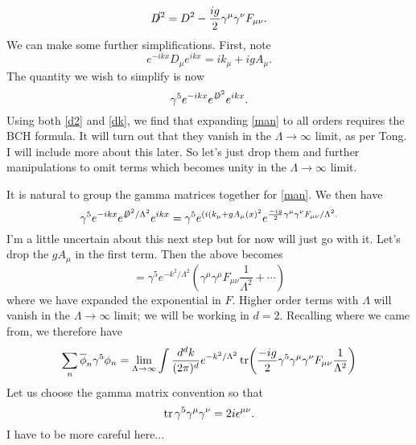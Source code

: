 \documentclass[main.tex]{subfiles}
\begin{document}
\begin{equation} \label{d2}
\slashed{D^2} = D^2 - \frac{ig}{2} \gamma^\mu \gamma^\nu F_{\mu \nu}.
\end{equation}
We can make some further simplifications. First, note
\begin{equation} \label{dk}
e^{-ikx} D_\mu e^{ikx} = i k_\mu + ig A_\mu.
\end{equation}
The quantity we wish to simplify is now
\begin{equation} \label{man}
\gamma^5 e^{-ikx} e^{\slashed{D}^2} e^{ikx}.
\end{equation}
Using both \ref{d2} and \ref{dk}, we find that expanding \ref{man} to all orders requires the BCH formula. It will turn out that they vanish in the $\Lambda \to \infty$ limit, as per Tong. I will include more about this later. So let's just drop them and further manipulations to omit terms which becomes unity in the $\Lambda \to \infty$ limit.

It is natural to group the gamma matrices together for \ref{man}. We then have
\[
\gamma^5 e^{-ikx} e^{\slashed{D}^2/\Lambda^2} e^{ikx} = \gamma^5 e^{(i(k_\mu + g A_\mu(x)^2} e^{\frac{-ig}{2} \gamma^\mu \gamma^\nu F_{\mu \nu}/\Lambda^2.}
\]
I'm a little uncertain about this next step but for now will just go with it. Let's drop the $g A_\mu$ in the first term. Then the above becomes
\[
= \gamma^5 e^{-k^2/\Lambda^2} \left(
\gamma^\mu \gamma^\mu F_{\mu \nu} \frac{1}{\Lambda^2} + \cdots
\right)
\]
where we have expanded the exponential in $F$. Higher order terms with $\Lambda$ will vanish in the $\Lambda \to \infty$ limit; we will be working in $d = 2$. Recalling where we came from, we therefore have
\begin{equation} \label{phigamphi}
\sum_n \overline{\phi}_n \gamma^5 \phi_n = \lim_{\Lambda \to \infty} \int \frac{d^d k}{(2\pi)^d} e^{-k^2/\Lambda^2} \tr (\frac{-ig}{2}\gamma^5 \gamma^\mu \gamma^\nu F_{\mu \nu} \frac{1}{\Lambda^2})
\end{equation}
Let us choose the gamma matrix convention so that
\[
\tr \gamma^5 \gamma^\mu \gamma^\nu = 2 i\epsilon^{\mu \nu}.
\]
I have to be more careful here...
\end{document}
